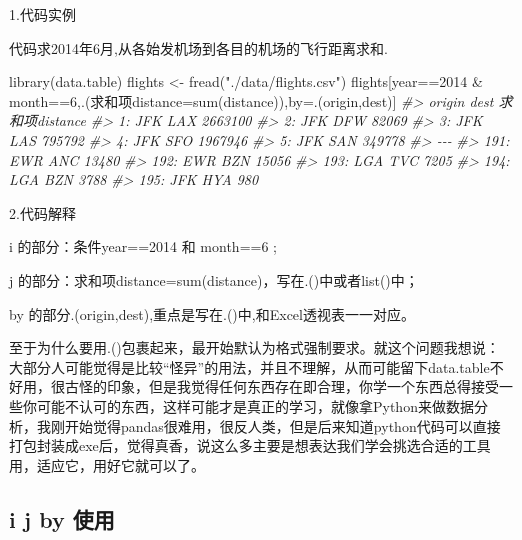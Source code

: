 \documentclass[
]{book}
\newenvironment{Shaded}{\begin{snugshade}}{\end{snugshade}}
\newcommand{\AttributeTok}[1]{\textcolor[rgb]{0.77,0.63,0.00}{#1}}
\newcommand{\CommentTok}[1]{\textcolor[rgb]{0.56,0.35,0.01}{\textit{#1}}}
\newcommand{\DecValTok}[1]{\textcolor[rgb]{0.00,0.00,0.81}{#1}}
\newcommand{\FunctionTok}[1]{\textcolor[rgb]{0.00,0.00,0.00}{#1}}
\newcommand{\NormalTok}[1]{#1}
\newcommand{\OtherTok}[1]{\textcolor[rgb]{0.56,0.35,0.01}{#1}}
\newcommand{\SpecialCharTok}[1]{\textcolor[rgb]{0.00,0.00,0.00}{#1}}
\newcommand{\StringTok}[1]{\textcolor[rgb]{0.31,0.60,0.02}{#1}}
\begin{document}
1.代码实例

代码求2014年6月,从各始发机场到各目的机场的飞行距离求和.

\begin{Shaded}
\begin{Highlighting}[]
\FunctionTok{library}\NormalTok{(data.table)}
\NormalTok{flights }\OtherTok{\textless{}{-}} \FunctionTok{fread}\NormalTok{(}\StringTok{"./data/flights.csv"}\NormalTok{)}
\NormalTok{flights[year}\SpecialCharTok{==}\DecValTok{2014} \SpecialCharTok{\&}\NormalTok{ month}\SpecialCharTok{==}\DecValTok{6}\NormalTok{,.(求和项}\AttributeTok{distance=}\FunctionTok{sum}\NormalTok{(distance)),by}\OtherTok{=}\NormalTok{.(origin,dest)]}
\CommentTok{\#\textgreater{}      origin dest 求和项distance}
\CommentTok{\#\textgreater{}   1:    JFK  LAX        2663100}
\CommentTok{\#\textgreater{}   2:    JFK  DFW          82069}
\CommentTok{\#\textgreater{}   3:    JFK  LAS         795792}
\CommentTok{\#\textgreater{}   4:    JFK  SFO        1967946}
\CommentTok{\#\textgreater{}   5:    JFK  SAN         349778}
\CommentTok{\#\textgreater{}  {-}{-}{-}                           }
\CommentTok{\#\textgreater{} 191:    EWR  ANC          13480}
\CommentTok{\#\textgreater{} 192:    EWR  BZN          15056}
\CommentTok{\#\textgreater{} 193:    LGA  TVC           7205}
\CommentTok{\#\textgreater{} 194:    LGA  BZN           3788}
\CommentTok{\#\textgreater{} 195:    JFK  HYA            980}
\end{Highlighting}
\end{Shaded}

2.代码解释

i 的部分：条件year==2014 和 month==6 ;

j 的部分：求和项distance=sum(distance)，写在.()中或者list()中；

by 的部分.(origin,dest),重点是写在.()中,和Excel透视表一一对应。

至于为什么要用.()包裹起来，最开始默认为格式强制要求。就这个问题我想说：大部分人可能觉得是比较``怪异''的用法，并且不理解，从而可能留下data.table不好用，很古怪的印象，但是我觉得任何东西存在即合理，你学一个东西总得接受一些你可能不认可的东西，这样可能才是真正的学习，就像拿Python来做数据分析，我刚开始觉得pandas很难用，很反人类，但是后来知道python代码可以直接打包封装成exe后，觉得真香，说这么多主要是想表达我们学会挑选合适的工具用，适应它，用好它就可以了。

\hypertarget{i-j-by-ux4f7fux7528}{%
\subsection{i j by 使用}\label{i-j-by-ux4f7fux7528}}
\end{document}
